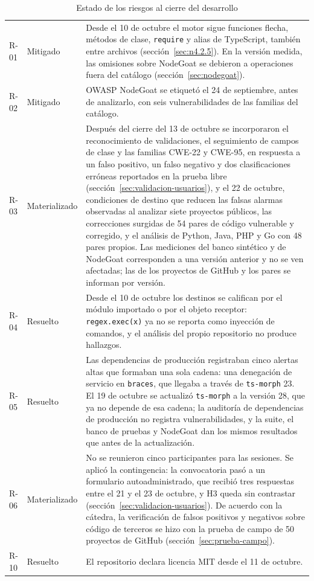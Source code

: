 \begin{table}[H]
    \centering
    \caption{Estado de los riesgos al cierre del desarrollo}
    \label{tab:estado-riesgos}
    \small
    \begin{tabularx}{\textwidth}{l l L}
        \toprule
         &  &  \\
        \midrule
        R-01 & Mitigado & Desde el 10 de octubre el motor sigue funciones flecha, métodos de clase, \texttt{require} y alias de TypeScript, también entre archivos (sección~\ref{sec:n4.2.5}). En la versión medida, las omisiones sobre NodeGoat se debieron a operaciones fuera del catálogo (sección~\ref{sec:nodegoat}). \\
        R-02 & Mitigado & OWASP NodeGoat se etiquetó el 24 de septiembre, antes de analizarlo, con seis vulnerabilidades de las familias del catálogo. \\
        R-03 & Materializado & Después del cierre del 13 de octubre se incorporaron el reconocimiento de validaciones, el seguimiento de campos de clase y las familias CWE-22 y CWE-95, en respuesta a un falso positivo, un falso negativo y dos clasificaciones erróneas reportados en la prueba libre (sección~\ref{sec:validacion-usuarios}), y el 22 de octubre, condiciones de destino que reducen las falsas alarmas observadas al analizar siete proyectos públicos, las correcciones surgidas de 54 pares de código vulnerable y corregido, y el análisis de Python, Java, PHP y Go con 48 pares propios. Las mediciones del banco sintético y de NodeGoat corresponden a una versión anterior y no se ven afectadas; las de los proyectos de GitHub y los pares se informan por versión. \\
        R-04 & Resuelto & Desde el 10 de octubre los destinos se califican por el módulo importado o por el objeto receptor: \texttt{regex.exec(x)} ya no se reporta como inyección de comandos, y el análisis del propio repositorio no produce hallazgos. \\
        R-05 & Resuelto & Las dependencias de producción registraban cinco alertas altas que formaban una sola cadena: una denegación de servicio en \texttt{braces}, que llegaba a través de \texttt{ts-morph} 23. El 19 de octubre se actualizó \texttt{ts-morph} a la versión 28, que ya no depende de esa cadena; la auditoría de dependencias de producción no registra vulnerabilidades, y la suite, el banco de pruebas y NodeGoat dan los mismos resultados que antes de la actualización. \\
        R-06 & Materializado & No se reunieron cinco participantes para las sesiones. Se aplicó la contingencia: la convocatoria pasó a un formulario autoadministrado, que recibió tres respuestas entre el 21 y el 23 de octubre, y H3 queda sin contrastar (sección~\ref{sec:validacion-usuarios}). De acuerdo con la cátedra, la verificación de falsos positivos y negativos sobre código de terceros se hizo con la prueba de campo de 50 proyectos de GitHub (sección~\ref{sec:prueba-campo}). \\
        R-10 & Resuelto & El repositorio declara licencia MIT desde el 11 de octubre. \\
        \bottomrule
    \end{tabularx}
\end{table}
